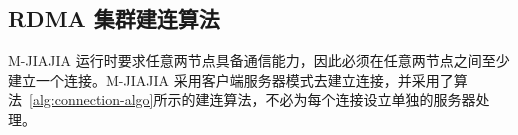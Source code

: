 {%




\subsection{RDMA 集群建连算法}

M-JIAJIA 运行时要求任意两节点具备通信能力，因此必须在任意两节点之间至少建立一个连接。M-JIAJIA 采用客户端服务器模式去建立连接，并采用了算法~\ref{alg:connection-algo}所示的建连算法，不必为每个连接设立单独的服务器处理。

}
